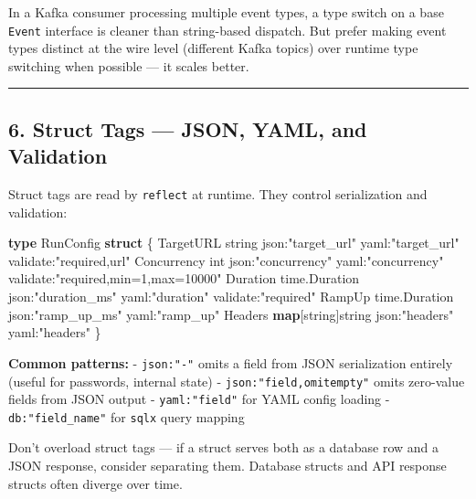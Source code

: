 \documentclass[
]{article}
\newenvironment{Shaded}{}{}
\newcommand{\DataTypeTok}[1]{\textcolor[rgb]{0.56,0.13,0.00}{#1}}
\newcommand{\KeywordTok}[1]{\textcolor[rgb]{0.00,0.44,0.13}{\textbf{#1}}}
\newcommand{\NormalTok}[1]{#1}
\newcommand{\OperatorTok}[1]{\textcolor[rgb]{0.40,0.40,0.40}{#1}}
\newcommand{\StringTok}[1]{\textcolor[rgb]{0.25,0.44,0.63}{#1}}
\begin{document}
In a Kafka consumer processing multiple event types, a type switch on a
base \texttt{Event} interface is cleaner than string-based dispatch. But
prefer making event types distinct at the wire level (different Kafka
topics) over runtime type switching when possible --- it scales better.

\begin{center}\rule{0.5\linewidth}{0.5pt}\end{center}

\hypertarget{struct-tags-json-yaml-and-validation}{%
\subsection{6. Struct Tags --- JSON, YAML, and
Validation}\label{struct-tags-json-yaml-and-validation}}

Struct tags are read by \texttt{reflect} at runtime. They control
serialization and validation:

\begin{Shaded}
\begin{Highlighting}[]
\KeywordTok{type}\NormalTok{ RunConfig }\KeywordTok{struct} \OperatorTok{\{}
\NormalTok{    TargetURL   }\DataTypeTok{string}        \StringTok{\textasciigrave{}json:"target\_url"   yaml:"target\_url"   validate:"required,url"\textasciigrave{}}
\NormalTok{    Concurrency }\DataTypeTok{int}           \StringTok{\textasciigrave{}json:"concurrency"  yaml:"concurrency"  validate:"required,min=1,max=10000"\textasciigrave{}}
\NormalTok{    Duration    time}\OperatorTok{.}\NormalTok{Duration }\StringTok{\textasciigrave{}json:"duration\_ms"  yaml:"duration"     validate:"required"\textasciigrave{}}
\NormalTok{    RampUp      time}\OperatorTok{.}\NormalTok{Duration }\StringTok{\textasciigrave{}json:"ramp\_up\_ms"   yaml:"ramp\_up"\textasciigrave{}}
\NormalTok{    Headers     }\KeywordTok{map}\OperatorTok{[}\DataTypeTok{string}\OperatorTok{]}\DataTypeTok{string} \StringTok{\textasciigrave{}json:"headers"  yaml:"headers"\textasciigrave{}}
\OperatorTok{\}}
\end{Highlighting}
\end{Shaded}

\textbf{Common patterns:} - \texttt{json:"-"} omits a field from JSON
serialization entirely (useful for passwords, internal state) -
\texttt{json:"field,omitempty"} omits zero-value fields from JSON output
- \texttt{yaml:"field"} for YAML config loading -
\texttt{db:"field\_name"} for \texttt{sqlx} query mapping

Don't overload struct tags --- if a struct serves both as a database row
and a JSON response, consider separating them. Database structs and API
response structs often diverge over time.
\end{document}
